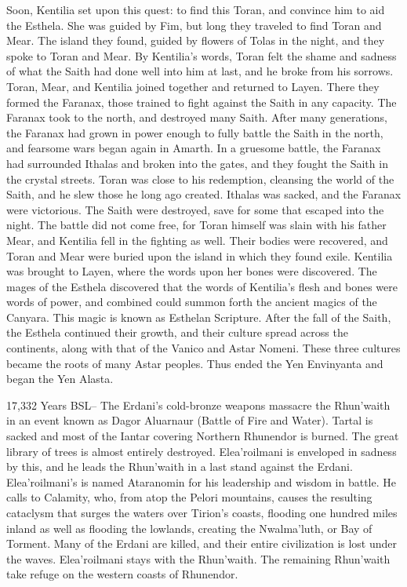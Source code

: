 \documentclass[smalldemyvopaper,11pt,twoside,onecolumn,openright,extrafontsizes]{memoir}
\begin{document}
	Soon, Kentilia set upon this quest: to find this Toran, and convince him to aid the Esthela. She was guided by Fim, but long they traveled to find Toran and Mear. The island they found, guided by flowers of Tolas in the night, and they spoke to Toran and Mear. By Kentilia’s words, Toran felt the shame and sadness of what the Saith had done well into him at last, and he broke from his sorrows. Toran, Mear, and Kentilia joined together and returned to Layen. There they formed the Faranax, those trained to fight against the Saith in any capacity. The Faranax took to the north, and destroyed many Saith. After many generations, the Faranax had grown in power enough to fully battle the Saith in the north, and fearsome wars began again in Amarth. In a gruesome battle, the Faranax had surrounded Ithalas and broken into the gates, and they fought the Saith in the crystal streets. Toran was close to his redemption, cleansing the world of the Saith, and he slew those he long ago created. Ithalas was sacked, and the Faranax were victorious. The Saith were destroyed, save for some that escaped into the night. The battle did not come free, for Toran himself was slain with his father Mear, and Kentilia fell in the fighting as well. Their bodies were recovered, and Toran and Mear were buried upon the island in which they found exile. Kentilia was brought to Layen, where the words upon her bones were discovered. The mages of the Esthela discovered that the words of Kentilia’s flesh and bones were words of power, and combined could summon forth the ancient magics of the Canyara. This magic is known as Esthelan Scripture. After the fall of the Saith, the Esthela continued their growth, and their culture spread across the continents, along with that of the Vanico and Astar Nomeni. These three cultures became the roots of many Astar peoples. Thus ended the Yen Envinyanta and began the Yen Alasta.

17,332 Years BSL-- The Erdani's cold-bronze weapons massacre the Rhun'waith in an event known as Dagor Aluarnaur (Battle of Fire and Water). Tartal is sacked and most of the Iantar covering Northern Rhunendor is burned. The great library of trees is almost entirely destroyed. Elea'roilmani is enveloped in sadness by this, and he leads the Rhun'waith in a last stand against the Erdani. Elea'roilmani's is named Ataranomin for his leadership and wisdom in battle. He calls to Calamity, who, from atop the Pelori mountains, causes the resulting cataclysm that surges the waters over Tirion's coasts, flooding one hundred miles inland as well as flooding the lowlands, creating the Nwalma'luth, or Bay of Torment. Many of the Erdani are killed, and their entire civilization is lost under the waves. Elea'roilmani stays with the Rhun'waith.
The remaining Rhun'waith take refuge on the western coasts of Rhunendor.
\end{document}
